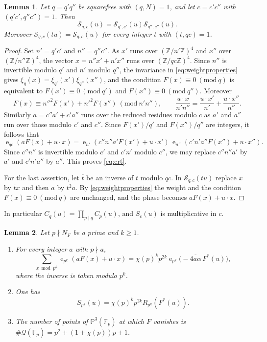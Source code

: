\documentclass[11pt]{amsart}
\numberwithin{equation}{section}
\numberwithin{figure}{section}
\newtheorem{lemma}{Lemma}[section]
\theoremstyle{definition}
\newcommand{\Z}{\mathbb{Z}}
\newcommand{\e}{\operatorname{e}}
\newcommand{\imod}[1]{\ (\mathrm{mod}\ #1)}
\newcommand{\Fp}{\mathbb F_p}
\newcommand{\PP}{\mathbb P}
\newcommand{\Qc}{\mathcal Q}
\begin{document}
\begin{lemma}\label{lem:crt}
Let $q=q'q''$ be squarefree with $(q,N)=1$, and let $c=c'c''$ with
$(q'c',q''c'')=1$. Then
\begin{equation}\label{eq:crt}
 \mathcal S_{q,c}(u)=\mathcal S_{q',c'}(u)\mathcal S_{q'',c''}(u).
\end{equation}
Moreover $\mathcal S_{q,c}(tu)=\mathcal S_{q,c}(u)$ for every integer
$t$ with $(t,qc)=1$.
\end{lemma}

\begin{proof}
Set $n'=q'c'$ and $n''=q''c''$. As $x'$ runs over $(\Z/n'\Z)^4$ and
$x''$ over $(\Z/n''\Z)^4$, the vector $x=n''x'+n'x''$ runs over
$(\Z/qc\Z)^4$. Since $n''$ is invertible modulo $q'$ and $n'$ modulo
$q''$, the invariance in \eqref{eq:weightproperties} gives
$\xi_q(x)=\xi_{q'}(x')\xi_{q''}(x'')$, and the condition
$F(x)\equiv0\imod q$ is equivalent to $F(x')\equiv0\imod{q'}$ and
$F(x'')\equiv0\imod{q''}$. Moreover
\[
 F(x)\equiv n''^2F(x')+n'^2F(x'')\imod{n'n''},
 \qquad
 \frac{u\cdot x}{n'n''}=\frac{u\cdot x'}{n'}+\frac{u\cdot x''}{n''}.
\]
Similarly $a=c''a'+c'a''$ runs over the reduced residues modulo $c$
as $a'$ and $a''$ run over those modulo $c'$ and $c''$. Since
$F(x')/q'$ and $F(x'')/q''$ are integers, it follows that
\[
 \e_{qc}(aF(x)+u\cdot x)
 =\e_{n'}(c''n''a'F(x')+u\cdot x')\,\e_{n''}(c'n'a''F(x'')+u\cdot x'').
\]
Since $c''n''$ is invertible modulo $c'$ and $c'n'$ modulo $c''$, we
may replace $c''n''a'$ by $a'$ and $c'n'a''$ by $a''$. This proves
\eqref{eq:crt}.

For the last assertion, let $\overline t$ be an inverse of $t$ modulo
$qc$. In $\mathcal S_{q,c}(tu)$ replace $x$ by $\overline tx$ and
then $a$ by $t^2a$. By \eqref{eq:weightproperties} the weight and the
condition $F(x)\equiv0\imod q$ are unchanged, and the phase becomes
$aF(x)+u\cdot x$.
\end{proof}

In particular $C_q(u)=\prod_{p\mid q}C_p(u)$, and $S_c(u)$ is
multiplicative in $c$.

\begin{lemma}\label{lem:gauss}
Let $p\nmid N_F$ be a prime and $k\ge1$.
\begin{enumerate}
\item[\textup{(i)}] For every integer $a$ with $p\nmid a$,
\begin{equation}\label{eq:gauss}
 \sum_{x\bmod p^k}\e_{p^k}(aF(x)+u\cdot x)
 =\chi(p)^kp^{2k}\e_{p^k}\big(-\overline{4a\alpha}\,F^*(u)\big),
\end{equation}
where the inverse is taken modulo $p^k$.
\item[\textup{(ii)}] One has
\begin{equation}\label{eq:unram}
 S_{p^k}(u)=\chi(p)^kp^{2k}R_{p^k}(F^*(u)).
\end{equation}
\item[\textup{(iii)}] The number of points of $\PP^3(\Fp)$ at which
$F$ vanishes is $\#\Qc(\Fp)=p^2+(1+\chi(p))p+1$.
\end{enumerate}
\end{lemma}
\end{document}
